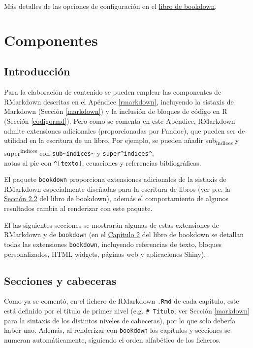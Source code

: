 \documentclass[]{book}
\theoremstyle{definition}
\theoremstyle{definition}
\theoremstyle{definition}
\theoremstyle{remark}
\begin{document}
Más detalles de las opciones de configuración en el
\href{https://bookdown.org/yihui/bookdown/configuration.html\#configuration}{libro
de bookdown}.

\chapter{Componentes}\label{componentes}

\section{Introducción}\label{introduccion}

Para la elaboración de contenido se pueden emplear las componentes de
RMarkdown descritas en el Apéndice \ref{rmarkdown}, incluyendo la
sistaxis de Markdown (Sección \ref{markdown}) y la inclusión de bloques
de código en R (Sección \ref{codigormd}). Pero como se comenta en este
Apéndice, RMarkdown admite extensiones adicionales (proporcionadas por
Pandoc), que pueden ser de utilidad en la escritura de un libro. Por
ejemplo, se pueden añadir sub\textsubscript{índices} y
super\textsuperscript{índices} con
\texttt{sub\textasciitilde{}índices\textasciitilde{}} y
\texttt{super\^{}índices\^{}},\\
notas al pie con \texttt{\^{}{[}texto{]}}, ecuaciones y referencias
bibliográficas.

El paquete \texttt{bookdown} proporciona extensiones adicionales de la
sistaxis de RMarkdown especialmente diseñadas para la escritura de
libros (ver p.e. la
\href{https://bookdown.org/yihui/bookdown/markdown-extensions-by-bookdown.html}{Sección
2.2} del libro de bookdown), además el comportamiento de algunos
resultados cambia al renderizar con este paquete.

El las siguientes secciones se mostrarán algunas de estas extensiones de
RMarkdown y de \texttt{bookdown} (en el
\href{https://bookdown.org/yihui/bookdown/markdown-extensions-by-bookdown.html}{Capítulo
2} del libro de bookdown se detallan todas las extensiones
\texttt{bookdown}, incluyendo referencias de texto, bloques
personalizados, HTML widgets, páginas web y aplicaciones Shiny).

\section{Secciones y cabeceras}\label{secciones-y-cabeceras}

Como ya se comentó, en el fichero de RMarkdown \texttt{.Rmd} de cada
capítulo, este está definido por el título de primer nivel (e.g.
\texttt{\#\ Título}; ver Sección \ref{markdown} para la sintaxis de los
distintos niveles de cabeceras), por lo que solo debería haber uno.
Además, al renderizar con \texttt{bookdown} los capítulos y secciones se
numeran automáticamente, siguiendo el orden alfabético de los ficheros.
\end{document}
